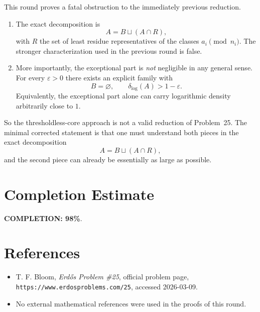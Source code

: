 This round proves a fatal obstruction to the immediately previous reduction.

\begin{enumerate}
\item The exact decomposition is
\[
A=B\sqcup (A\cap R),
\]
with \(R\) the set of least residue representatives of the classes \(a_i\pmod{n_i}\).  The stronger characterization used in the previous round is false.

\item More importantly, the exceptional part is \emph{not} negligible in any general sense.  For every \(\varepsilon>0\) there exists an explicit family with
\[
B=\varnothing,
\qquad
\delta_{\log}(A)>1-\varepsilon.
\]
Equivalently, the exceptional part alone can carry logarithmic density arbitrarily close to \(1\).
\end{enumerate}

So the thresholdless-core approach is not a valid reduction of Problem~25.  The minimal corrected statement is that one must understand both pieces in the exact decomposition
\[
A=B\sqcup (A\cap R),
\]
and the second piece can already be essentially as large as possible.

\section{Completion Estimate}
\textbf{COMPLETION: 98\%}.

\section{References}
\begin{itemize}
\item T. F. Bloom, \emph{Erd\H{o}s Problem \#25}, official problem page, \texttt{https://www.erdosproblems.com/25}, accessed 2026-03-09.
\item No external mathematical references were used in the proofs of this round.
\end{itemize}
